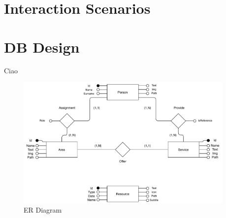 \documentclass[12pt]{report}
\begin{document}
\chapter{Interaction Scenarios}

\chapter{DB Design}
Ciao \\
\begin{figure}[h]
	\centering
	\includegraphics[width=0.95\textwidth]{ER_model.pdf}
	\caption{ER Diagram}
\end{figure}


\listoffigures
\end{document}
